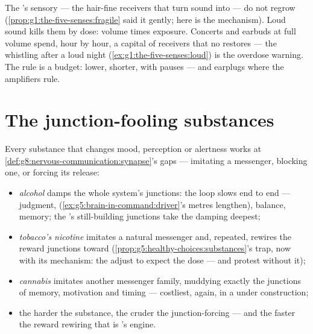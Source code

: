\begin{proposition}\label{prop:g8:protecting-the-nervous-system:noise}
The 's sensory  --- the hair-fine receivers that
turn sound into  --- do not regrow
(\cref{prop:g1:the-five-senses:fragile} said it gently;
here is the mechanism). Loud sound kills them by dose:
volume times exposure. Concerts and earbuds at full
volume spend, hour by hour, a capital of receivers that
no  restores --- the whistling after a loud night
(\cref{ex:g1:the-five-senses:loud}) is the overdose
warning. The rule is a budget: lower, shorter, with
pauses --- and earplugs where the amplifiers rule.
\end{proposition}
\admitted

\section{The junction-fooling substances}

\begin{proposition}\label{prop:g8:protecting-the-nervous-system:substances}
Every substance that changes mood, perception or alertness
works at \cref{def:g8:nervous-communication:synapse}'s
gaps --- imitating a messenger, blocking one, or forcing
its release:
\begin{itemize}
  \item \emph{alcohol} damps the whole system's junctions:
        the loop slows end to end --- judgment,  (\cref{ex:g5:brain-in-command:driver}'s
        metres lengthen), balance, memory; the 
        's still-building junctions take the damping
        deepest;
  \item \emph{tobacco's nicotine} imitates a natural
        messenger and, repeated, rewires the reward
        junctions toward \emph{}
        (\cref{prop:g5:healthy-choices:substances}'s trap,
        now with its mechanism: the  adjust to
        expect the dose --- and protest without it);
  \item \emph{cannabis} imitates another messenger family,
        muddying exactly the junctions of memory,
        motivation and timing --- costliest, again, in a
         under construction;
  \item the harder the substance, the cruder the
        junction-forcing --- and the faster the reward
        rewiring that is 's engine.
\end{itemize}
\end{proposition}
\admitted

